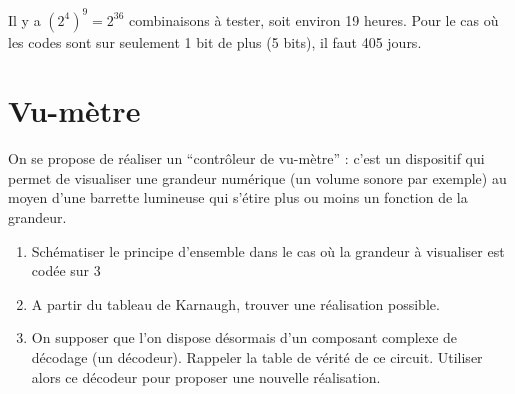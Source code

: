 \documentclass[a4paper,11pt]{article}
\begin{document}
\begin{cadre}
Il y a $(2^4)^9=2^{36}$ combinaisons à tester, soit environ 19 heures.
Pour le cas où les codes sont sur seulement 1 bit de plus (5 bits), il faut 405 jours.
\end{cadre}

\section{Vu-mètre}
On se propose de réaliser un ``contrôleur de vu-mètre'' : c'est un dispositif qui permet de visualiser une grandeur numérique (un volume sonore par exemple) au moyen d'une barrette lumineuse qui s'étire plus ou moins un fonction de la grandeur.
\begin{enumerate}
\item Schématiser le principe d'ensemble dans le cas où la grandeur à visualiser est codée sur 3
\item A partir du tableau de Karnaugh, trouver une réalisation possible.
\item On supposer que l'on dispose désormais d'un composant complexe de décodage (un décodeur). Rappeler la table de vérité de ce circuit. Utiliser alors ce décodeur pour proposer une nouvelle réalisation.
\end{enumerate}
\end{document}
